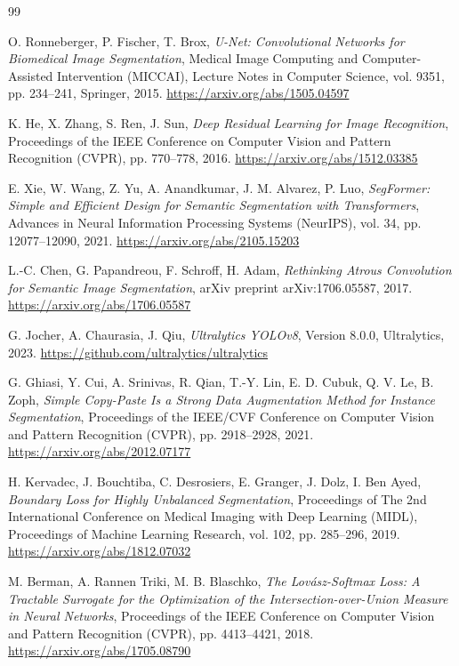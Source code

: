 \documentclass[12pt,a4paper]{report}
\begin{document}
\begin{thebibliography}{99}

O. Ronneberger, P. Fischer, T. Brox,
\textit{U-Net: Convolutional Networks for Biomedical Image Segmentation},
Medical Image Computing and Computer-Assisted Intervention (MICCAI),
Lecture Notes in Computer Science, vol. 9351, pp. 234--241,
Springer, 2015.
\url{https://arxiv.org/abs/1505.04597}

K. He, X. Zhang, S. Ren, J. Sun,
\textit{Deep Residual Learning for Image Recognition},
Proceedings of the IEEE Conference on Computer Vision and Pattern Recognition (CVPR),
pp. 770--778, 2016.
\url{https://arxiv.org/abs/1512.03385}

E. Xie, W. Wang, Z. Yu, A. Anandkumar, J. M. Alvarez, P. Luo,
\textit{SegFormer: Simple and Efficient Design for Semantic Segmentation with Transformers},
Advances in Neural Information Processing Systems (NeurIPS), vol. 34,
pp. 12077--12090, 2021.
\url{https://arxiv.org/abs/2105.15203}

L.-C. Chen, G. Papandreou, F. Schroff, H. Adam,
\textit{Rethinking Atrous Convolution for Semantic Image Segmentation},
arXiv preprint arXiv:1706.05587, 2017.
\url{https://arxiv.org/abs/1706.05587}

G. Jocher, A. Chaurasia, J. Qiu,
\textit{Ultralytics YOLOv8},
Version 8.0.0, Ultralytics, 2023.
\url{https://github.com/ultralytics/ultralytics}

G. Ghiasi, Y. Cui, A. Srinivas, R. Qian, T.-Y. Lin, E. D. Cubuk, Q. V. Le, B. Zoph,
\textit{Simple Copy-Paste Is a Strong Data Augmentation Method for Instance Segmentation},
Proceedings of the IEEE/CVF Conference on Computer Vision and Pattern Recognition (CVPR),
pp. 2918--2928, 2021.
\url{https://arxiv.org/abs/2012.07177}

H. Kervadec, J. Bouchtiba, C. Desrosiers, E. Granger, J. Dolz, I. Ben Ayed,
\textit{Boundary Loss for Highly Unbalanced Segmentation},
Proceedings of The 2nd International Conference on Medical Imaging with Deep Learning (MIDL),
Proceedings of Machine Learning Research, vol. 102, pp. 285--296, 2019.
\url{https://arxiv.org/abs/1812.07032}

M. Berman, A. Rannen Triki, M. B. Blaschko,
\textit{The Lov\'asz-Softmax Loss: A Tractable Surrogate for the Optimization of the Intersection-over-Union Measure in Neural Networks},
Proceedings of the IEEE Conference on Computer Vision and Pattern Recognition (CVPR),
pp. 4413--4421, 2018.
\url{https://arxiv.org/abs/1705.08790}


\end{thebibliography}
\end{document}

